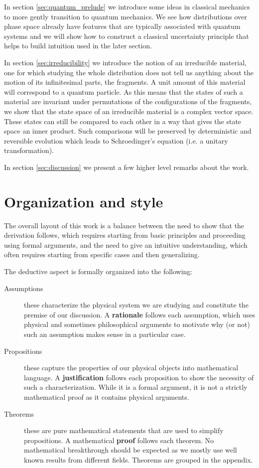\documentclass[smallextended]{svjour3}
\numberwithin{equation}{section}
\theoremstyle{definition}
\begin{document}
In section \ref{sec:quantum_prelude} we introduce some ideas in classical mechanics to more gently transition to quantum mechanics. We see how distributions over phase space already have features that are typically associated with quantum systems and we will show how to construct a classical uncertainty principle that helps to build intuition used in the later section.

In section \ref{sec:irreducibility} we introduce the notion of an irreducible material, one for which studying the whole distribution does not tell us anything about the motion of its infinitesimal parts, the fragments. A unit amount of this material will correspond to a quantum particle. As this means that the states of such a material are invariant under permutations of the configurations of the fragments, we show that the state space of an irreducible material is a complex vector space. These states can still be compared to each other in a way that gives the state space an inner product. Such comparisons will be preserved by deterministic and reversible evolution which leads to Schroedinger's equation (i.e. a unitary transformation).

In section \ref{sec:discussion} we present a few higher level remarks about the work.

\section{Organization and style}

The overall layout of this work is a balance between the need to show that the derivation follows, which requires starting from basic principles and proceeding using formal arguments, and the need to give an intuitive understanding, which often requires starting from specific cases and then generalizing.

The deductive aspect is formally organized into the following:
\begin{description}
  \item[Assumptions] these characterize the physical system we are studying and constitute the premise of our discussion. A \textbf{rationale} follows each assumption, which uses physical and sometimes philosophical arguments to motivate why (or not) such an assumption makes sense in a particular case.
  
  \item[Propositions] these capture the properties of our physical objects into mathematical language. A \textbf{justification} follows each proposition to show the necessity of such a characterization. While it is a formal argument, it is not a strictly mathematical proof as it contains physical arguments.
  
  \item[Theorems] these are pure mathematical statements that are used to simplify propositions. A mathematical \textbf{proof} follows each theorem. No mathematical breakthrough should be expected as we mostly use well known results from different fields. Theorems are grouped in the appendix.
\end{description}
\end{document}
